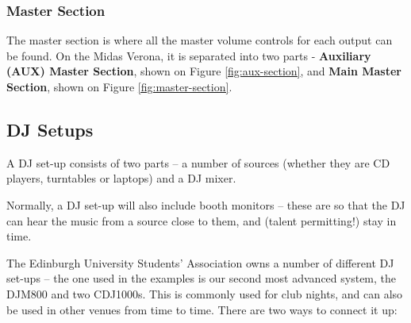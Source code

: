 \documentclass[14pt,twocolumn]{extarticle} %
\begin{document}
\subsubsection{Master Section}
\label{master-section}
The master section is where all the master volume controls for each output can be found. On the Midas Verona, it is separated into two parts - \textbf{Auxiliary (AUX) Master Section}, shown on Figure \ref{fig:aux-section}, and \textbf{Main Master Section}, shown on Figure \ref{fig:master-section}.


\subsection{DJ Setups}
\label{dj-setup}
A DJ set-up consists of two parts – a number of sources (whether they are CD players, turntables or laptops) and a DJ mixer.

Normally, a DJ set-up will also include booth monitors – these are so that the DJ can hear the music from a source close to them, and (talent permitting!) stay in time.

The Edinburgh University Students' Association owns a number of different DJ set-ups – the one used in the examples is our second most advanced system, the DJM800 and two CDJ1000s. This is commonly used for club nights, and can also be used in other venues from time to time. There are two ways to connect it up:
\end{document}
